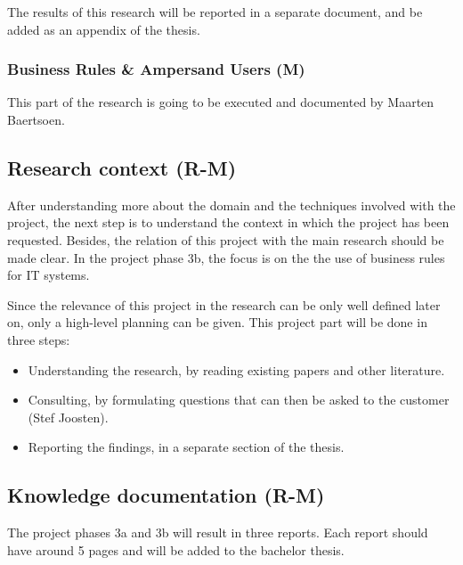\noindent
The results of this research will be reported in a separate document, and be added as an appendix of the thesis.

\subsubsection{Business Rules \& Ampersand Users (M)}
This part of the research is going to be executed and documented by Maarten Baertsoen.

\subsection{Research context (R-M)}
%
After understanding more about the domain and the techniques involved with the project, the next step is to understand the context in which the project has been requested.
Besides, the relation of this project with the main research should be made clear.
In the project phase 3b, the focus is on the the use of business rules for IT systems.

Since the relevance of this project in the research can be only well defined later on, only a high-level planning can be given.
This project part will be done in three steps:
\begin{itemize}
	\item Understanding the research, by reading existing papers and other literature.
	\item Consulting, by formulating questions that can then be asked to the customer (Stef Joosten).
	\item Reporting the findings, in a separate section of the thesis.
\end{itemize}

\subsection{Knowledge documentation (R-M)}
The project phases 3a and 3b will result in three reports.
Each report should have around 5 pages and will be added to the bachelor thesis.

